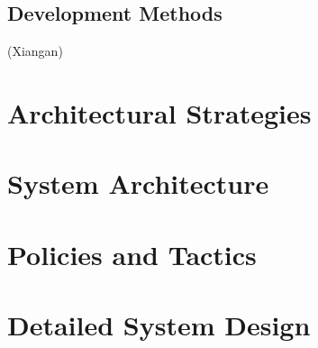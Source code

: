 \documentclass[runningheads]{llncs}
\begin{document}
\subsection{Development Methods}
(Xiangan)

\section{Architectural Strategies}
\section{System Architecture}
\section{Policies and Tactics}
\section{Detailed System Design}





\end{document}
